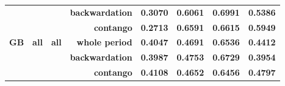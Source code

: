 \documentclass[
  authoryear,
  preprint,
  3p]{elsarticle}
\begin{document}
\begin{longtable}[t]{>{}l>{}l>{}l>{}r>{}r>{}r>{}r>{}r}
\textbf{} & \textbf{} & \textbf{} & \textbf{backwardation} & \textcolor[HTML]{4285f4}{\textbf{0.3070}} & \textcolor[HTML]{4285f4}{\textbf{0.6061}} & \textcolor[HTML]{4285f4}{\textbf{0.6991}} & \textcolor[HTML]{4285f4}{\textbf{0.5386}}\\
\textbf{} & \textbf{} & \textbf{} & \textbf{contango} & \textcolor[HTML]{4285f4}{\textbf{0.2713}} & \textcolor[HTML]{4285f4}{\textbf{0.6591}} & \textcolor[HTML]{4285f4}{\textbf{0.6615}} & \textcolor[HTML]{4285f4}{\textbf{0.5949}}\\
\addlinespace
\textbf{GB} & \textbf{all} & \textbf{all} & \textbf{whole period} & \textcolor[HTML]{4285f4}{\textbf{0.4047}} & \textcolor[HTML]{4285f4}{\textbf{0.4691}} & \textcolor[HTML]{4285f4}{\textbf{0.6536}} & \textcolor[HTML]{4285f4}{\textbf{0.4412}}\\
\textbf{} & \textbf{} & \textbf{} & \textbf{backwardation} & \textcolor[HTML]{4285f4}{\textbf{0.3987}} & \textcolor[HTML]{4285f4}{\textbf{0.4753}} & \textcolor[HTML]{4285f4}{\textbf{0.6729}} & \textcolor[HTML]{4285f4}{\textbf{0.3954}}\\
\textbf{} & \textbf{} & \textbf{} & \textbf{contango} & \textcolor[HTML]{4285f4}{\textbf{0.4108}} & \textcolor[HTML]{4285f4}{\textbf{0.4652}} & \textcolor[HTML]{4285f4}{\textbf{0.6456}} & \textcolor[HTML]{4285f4}{\textbf{0.4797}}\\
\bottomrule

\end{longtable}

\endgroup{}

\begingroup\fontsize{7}{9}\selectfont
\end{document}
